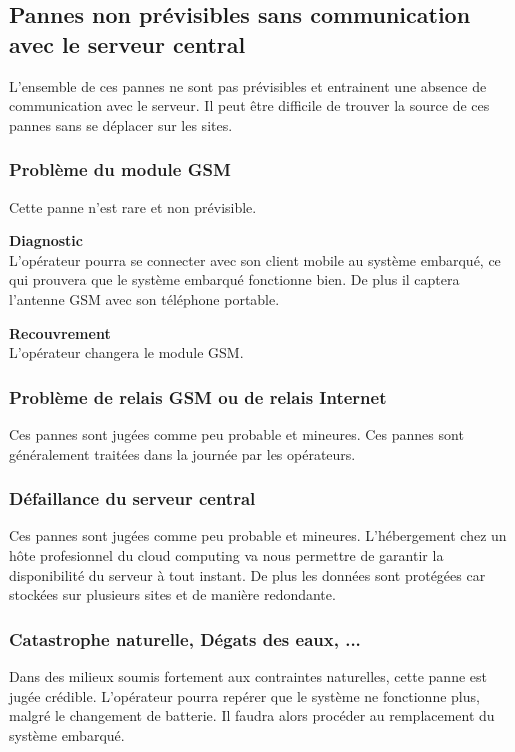 \subsection{Pannes non prévisibles sans communication avec le serveur central}

L'ensemble de ces pannes ne sont pas prévisibles et entrainent une absence de 
communication avec le serveur. Il peut être difficile de trouver la source de ces 
pannes sans se déplacer sur les sites.

\subsubsection{Problème du module GSM}
Cette panne n'est rare et non prévisible. 

\textbf{Diagnostic} \\

L'opérateur pourra se connecter avec son client mobile au système embarqué, 
ce qui prouvera que le système embarqué fonctionne bien.
De plus il captera l'antenne GSM avec son téléphone portable. 

\textbf{Recouvrement} \\

L'opérateur changera le module GSM.

\subsubsection{Problème de relais GSM ou de relais Internet}

Ces pannes sont jugées comme peu probable et mineures. Ces pannes sont 
généralement traitées dans la journée par les opérateurs.

\subsubsection{Défaillance du serveur central}

Ces pannes sont jugées comme peu probable et mineures. 
L'hébergement chez un hôte profesionnel du cloud computing va nous permettre de 
garantir la disponibilité du serveur à tout instant. De plus les données sont 
protégées car stockées sur plusieurs sites et de manière redondante.

\subsubsection{Catastrophe naturelle, Dégats des eaux,  ...}

Dans des milieux soumis fortement aux contraintes naturelles, cette panne est jugée crédible.
L'opérateur pourra repérer que le système ne fonctionne plus, malgré le changement de batterie. 
Il faudra alors procéder au remplacement du système embarqué.



